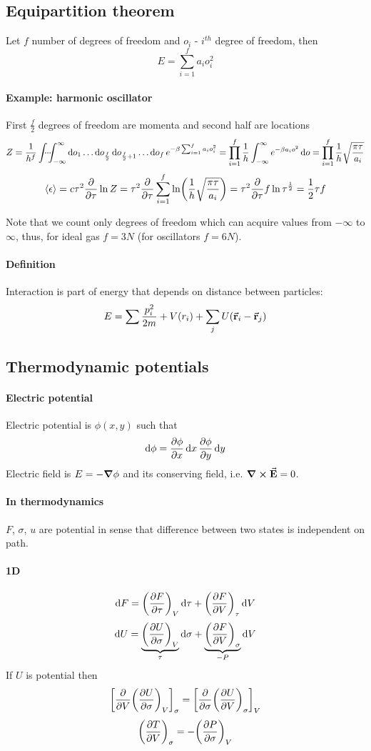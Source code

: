 \subsection{Equipartition theorem}
Let $f$ number of degrees of freedom and $o_i$ - $i^{th}$ degree of freedom, then
$$E = \sum_{i=1}^f a_io_i^2$$

\paragraph{Example: harmonic oscillator}
First $\frac{f}{2}$ degrees of freedom are momenta and second half are locations
$$Z = \frac{1}{h^f}  \idotsint_{-\infty}^\infty \dd{o_1} \dots \dd{o_{\frac{f}{2}}} \dd{o_{\frac{f}{2}+1}}\dots \dd{o_f} e^{-\beta \sum_{i=1}^f a_io_i^2} = \prod_{i=1}^f \frac{1}{h} \int_{-\infty}^\infty e^{-\beta a_io^2} \dd{o}  = \prod_{i=1}^f \frac{1}{h} \sqrt{\frac{\pi \tau}{a_i}}$$
$$\expval{\epsilon} =c\tau^2 \pdv{\tau} \ln Z = \tau^2 \pdv{\tau} \sum_{i=1}^f \ln(\frac{1}{h} \sqrt{\frac{\pi \tau}{a_i}}) = \tau^2 \pdv{\tau} f\ln \tau^{\frac{1}{2}} = \frac{1}{2} \tau f$$

Note that we count only degrees of freedom which can acquire values from $-\infty$ to $\infty$, thus, for ideal gas $f=3N$ (for oscillators $f=6N$).
\paragraph{Definition} Interaction is part of energy that depends on distance between particles:
$$E = \sum \frac{p_i^2}{2m} + V(r_i) + \sum_j U(\va{r}_i-\va{r}_j)$$
\subsection{Thermodynamic potentials}
\paragraph{Electric potential}
Electric potential is $\phi(x,y)$ such that
$$\dd{\phi} = \pdv{\phi}{x} \dd{x} \pdv{\phi}{y} \dd{y}$$
Electric field is $E = -\grad{\phi}$ and its conserving field, i.e. $\curl{\va{E}} = 0$.
\paragraph{In thermodynamics}
$F$, $\sigma$, $u$ are potential in sense that difference between two states is independent on path.

\paragraph{1D}
$$\dd{F} = \qty(\pdv{F}{\tau})_V \dd{\tau} + \qty(\pdv{F}{V})_\tau \dd{V}$$
$$\dd{U} = \underbrace{\qty(\pdv{U}{\sigma})_V}_{\tau} \dd{\sigma} + \underbrace{\qty(\pdv{F}{V})_\sigma}_{-P} \dd{V}$$
If $U$ is potential then
$$\qty[\pdv{V} \qty(\pdv{U}{\sigma})_V]_\sigma =\qty[ \pdv{\sigma} \qty(\pdv{U}{V})_\sigma]_V$$
$$\qty(\pdv{T}{V})_\sigma = -\qty(\pdv{P}{\sigma})_V$$


